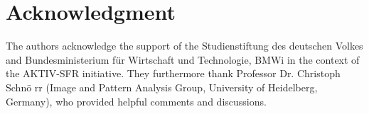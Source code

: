 \documentclass[10pt,letterpaper,journal,compsoc]{IEEEtran}
\begin{document}


\section*{Acknowledgment}
The authors acknowledge the support of the Studienstiftung
des deutschen Volkes and Bundesministerium f\"ur Wirtschaft und
Technologie, BMWi in the context of the AKTIV-SFR
initiative. They furthermore thank Professor Dr. Christoph
Schn\"o rr (Image and Pattern Analysis Group, University of
Heidelberg, Germany), who provided helpful comments
and discussions.
\end{document}
